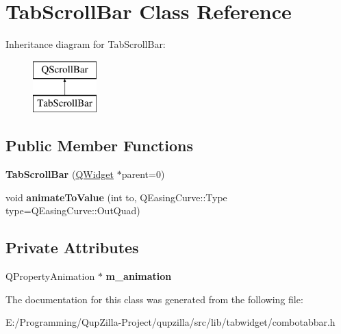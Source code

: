 \hypertarget{class_tab_scroll_bar}{
\section{TabScrollBar Class Reference}
\label{class_tab_scroll_bar}
}
Inheritance diagram for TabScrollBar:\begin{figure}[H]
\begin{center}
\leavevmode
\includegraphics[height=2cm]{class_tab_scroll_bar}
\end{center}
\end{figure}
\subsection*{Public Member Functions}
\begin{DoxyCompactItemize}
\item 
\hypertarget{class_tab_scroll_bar_ad3f68bba5a829dff8801bb7c00631cae}{
{\bfseries TabScrollBar} (\hyperlink{class_q_widget}{QWidget} $\ast$parent=0)}
\label{class_tab_scroll_bar_ad3f68bba5a829dff8801bb7c00631cae}

\item 
\hypertarget{class_tab_scroll_bar_a0c7cc84d20a2f815a1e72c7c5c36884c}{
void {\bfseries animateToValue} (int to, QEasingCurve::Type type=QEasingCurve::OutQuad)}
\label{class_tab_scroll_bar_a0c7cc84d20a2f815a1e72c7c5c36884c}

\end{DoxyCompactItemize}
\subsection*{Private Attributes}
\begin{DoxyCompactItemize}
\item 
\hypertarget{class_tab_scroll_bar_aaf92339a1a9d6cb3a206c8d07819cae0}{
QPropertyAnimation $\ast$ {\bfseries m\_\-animation}}
\label{class_tab_scroll_bar_aaf92339a1a9d6cb3a206c8d07819cae0}

\end{DoxyCompactItemize}


The documentation for this class was generated from the following file:\begin{DoxyCompactItemize}
\item 
E:/Programming/QupZilla-\/Project/qupzilla/src/lib/tabwidget/combotabbar.h\end{DoxyCompactItemize}
